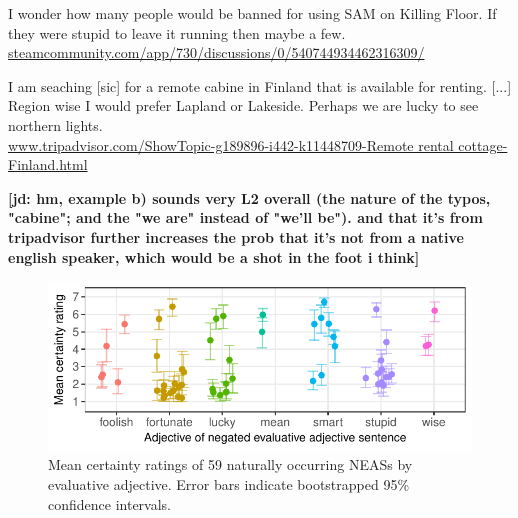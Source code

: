 \documentclass[11pt,fleqn]{article}
\newcommand{\6}{\mbox{$[\hspace*{-.6mm}[$}}
\newcommand{\9}{\mbox{$]\hspace*{-.6mm}]$}}
\newcommand{\jd}[1]{\textbf{\color{red}[jd: #1]}}
\begin{document}
{\begin{exe}
\begin{xlist}
\ex 
\begin{xlist}
 I wonder how many people would be banned for using SAM on Killing Floor.
 If they were stupid to leave it running then maybe a few.\\ \url{steamcommunity.com/app/730/discussions/0/540744934462316309/}
\end{xlist}
\ex I am seaching [sic] for a remote cabine in Finland that is available for renting. [...]
Region wise I would prefer Lapland or Lakeside. Perhaps we are lucky to see northern lights. \\ \url{www.tripadvisor.com/ShowTopic-g189896-i442-k11448709-Remote rental cottage-Finland.html}
\end{xlist}
\end{exe}
 \jd{hm, example b) sounds very L2 overall (the nature of the typos, "cabine"; and the "we are" instead of "we'll be"). and that it's from tripadvisor further increases the prob that it's not from a native english speaker, which would be a shot in the foot i think}
}

\begin{figure}[h!]
\centering

\includegraphics[width=.6\paperwidth]{../exp1-corpus-study/graphs/mean-response-by-item-and-adj}

\caption{Mean certainty ratings of 59 naturally occurring NEASs by evaluative adjective. Error bars indicate bootstrapped 95\% confidence intervals.}\label{f-corpus}

\end{figure}
\end{document}
